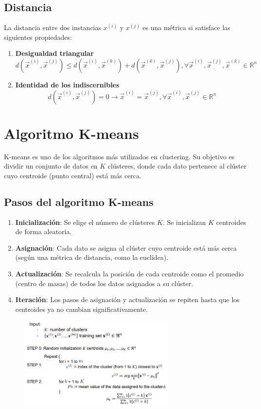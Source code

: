 \subsection{Distancia}
La distancia entre dos instancias $x^{(i)}$ y $x^{(j)}$ es una métrica si satisface las siguientes propiedades:
\begin{enumerate}
\item \textbf{Desigualdad triangular}
$$d(\vec{x}^{(i)}, \vec{x}^{(j)}) \leq d(\vec{x}^{(i)}, \vec{x}^{(k)}) + d(\vec{x}^{(k)}, \vec{x}^{(j)}), \forall  \vec{x}^{(i)}, \vec{x}^{(j)}, \vec{x}^{(k)} \in \mathbb{R}^n$$

\item \textbf{Identidad de los indiscernibles}
$$d(\vec{x}^{(i)}, \vec{x}^{(j)}) = 0 \rightarrow \vec{x}^{(i)} = \vec{x}^{(j)}, \forall \vec{x}^{(i)}, \vec{x}^{(j)} \in \mathbb{R}^n$$
\end{enumerate}

\section{Algoritmo K-means}
K-means es uno de los algoritmos más utilizados en clustering. Su objetivo es dividir un conjunto de datos en $K$ clústeres, donde cada dato pertenece al clúster cuyo centroide (punto central) está más cerca.

\subsection{Pasos del algoritmo K-means}
\begin{enumerate}
\item \textbf{Inicialización}: Se elige el número de clústeres $K$. Se inicializan $K$ centroides de forma aleatoria.
\item \textbf{Asignación}: Cada dato se asigna al clúster cuyo centroide está más cerca (según una métrica de distancia, como la euclídea).
\item \textbf{Actualización}: Se recalcula la posición de cada centroide como el promedio (centro de masas) de todos los datos asignados a su clúster.
\item \textbf{Iteración}: Los pasos de asignación y actualización se repiten hasta que los centroides ya no cambian significativamente.
\end{enumerate}

\begin{figure}[h]
\centering
\includegraphics[width = 0.7\textwidth]{figs/kmeans-algorithm.png}
\end{figure}

